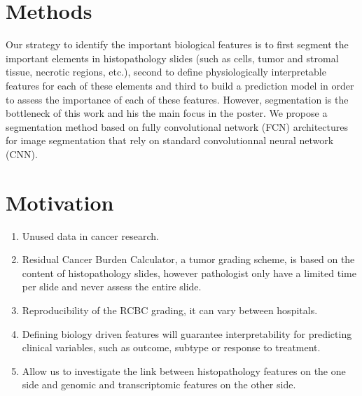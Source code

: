 \documentclass[a0,portrait]{a0poster}
\begin{document}
\begin{multicols}{2}



\color{SaddleBrown} %

\section*{Methods}

Our strategy to identify the important biological features is to first
segment the important elements in histopathology slides (such as
cells, tumor and stromal tissue, necrotic regions, etc.), second to
define physiologically interpretable features for each of these
elements and third to build a prediction model in order to assess the
importance of each of these features. However, segmentation is the
bottleneck of this work and his the main focus in the poster. 
We propose a segmentation method based on fully convolutional network
(FCN)  architectures for image segmentation that rely on standard
convolutionnal neural network (CNN). 

\color{DarkSlateGray} %

\section*{Motivation}

\begin{enumerate}
\item Unused data in cancer research.
\item Residual Cancer Burden Calculator, a tumor grading scheme, is
  based on the content of histopathology slides, however pathologist
  only have a limited time per slide and never assess the entire slide.
\item Reproducibility of the RCBC grading, it can vary between hospitals.
\item Defining biology driven features will guarantee interpretability for predicting clinical variables, such as outcome, subtype or response to treatment.
\item Allow us to investigate the link between histopathology features
  on the one side and genomic and transcriptomic features on the other
  side.
\end{enumerate}


\end{multicols}
\end{document}
